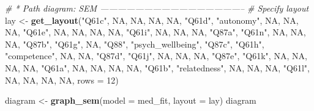 \documentclass[
]{article}
\newenvironment{Shaded}{\begin{snugshade}}{\end{snugshade}}
\newcommand{\CommentTok}[1]{\textcolor[rgb]{0.56,0.35,0.01}{\textit{#1}}}
\newcommand{\DataTypeTok}[1]{\textcolor[rgb]{0.13,0.29,0.53}{#1}}
\newcommand{\DecValTok}[1]{\textcolor[rgb]{0.00,0.00,0.81}{#1}}
\newcommand{\KeywordTok}[1]{\textcolor[rgb]{0.13,0.29,0.53}{\textbf{#1}}}
\newcommand{\NormalTok}[1]{#1}
\newcommand{\OtherTok}[1]{\textcolor[rgb]{0.56,0.35,0.01}{#1}}
\newcommand{\StringTok}[1]{\textcolor[rgb]{0.31,0.60,0.02}{#1}}
\begin{document}
\begin{Shaded}
\begin{Highlighting}[]
\CommentTok{# * Path diagram: SEM --------------------------------------------------}
\CommentTok{# Specify layout}
\NormalTok{lay <-}\StringTok{ }\KeywordTok{get_layout}\NormalTok{(}\StringTok{"Q61c"}\NormalTok{, }\OtherTok{NA}\NormalTok{, }\OtherTok{NA}\NormalTok{, }\OtherTok{NA}\NormalTok{, }\OtherTok{NA}\NormalTok{,}
                  \StringTok{"Q61d"}\NormalTok{, }\StringTok{"autonomy"}\NormalTok{, }\OtherTok{NA}\NormalTok{, }\OtherTok{NA}\NormalTok{, }\OtherTok{NA}\NormalTok{,}
                  \StringTok{"Q61e"}\NormalTok{, }\OtherTok{NA}\NormalTok{, }\OtherTok{NA}\NormalTok{, }\OtherTok{NA}\NormalTok{, }\OtherTok{NA}\NormalTok{,}
                  \StringTok{"Q61i"}\NormalTok{, }\OtherTok{NA}\NormalTok{, }\OtherTok{NA}\NormalTok{, }\OtherTok{NA}\NormalTok{, }\StringTok{"Q87a"}\NormalTok{,}
                  \StringTok{"Q61n"}\NormalTok{, }\OtherTok{NA}\NormalTok{, }\OtherTok{NA}\NormalTok{, }\OtherTok{NA}\NormalTok{, }\StringTok{"Q87b"}\NormalTok{,}
                  \StringTok{"Q61g"}\NormalTok{, }\OtherTok{NA}\NormalTok{, }\StringTok{"Q88"}\NormalTok{, }\StringTok{"psych_wellbeing"}\NormalTok{, }\StringTok{"Q87c"}\NormalTok{,}
                  \StringTok{"Q61h"}\NormalTok{, }\StringTok{"competence"}\NormalTok{, }\OtherTok{NA}\NormalTok{, }\OtherTok{NA}\NormalTok{, }\StringTok{"Q87d"}\NormalTok{,}
                  \StringTok{"Q61j"}\NormalTok{, }\OtherTok{NA}\NormalTok{, }\OtherTok{NA}\NormalTok{, }\OtherTok{NA}\NormalTok{, }\StringTok{"Q87e"}\NormalTok{,}
                  \StringTok{"Q61k"}\NormalTok{, }\OtherTok{NA}\NormalTok{, }\OtherTok{NA}\NormalTok{, }\OtherTok{NA}\NormalTok{, }\OtherTok{NA}\NormalTok{,}
                  \StringTok{"Q61a"}\NormalTok{, }\OtherTok{NA}\NormalTok{, }\OtherTok{NA}\NormalTok{, }\OtherTok{NA}\NormalTok{, }\OtherTok{NA}\NormalTok{,}
                  \StringTok{"Q61b"}\NormalTok{, }\StringTok{"relatedness"}\NormalTok{, }\OtherTok{NA}\NormalTok{, }\OtherTok{NA}\NormalTok{, }\OtherTok{NA}\NormalTok{,}
                  \StringTok{"Q61l"}\NormalTok{, }\OtherTok{NA}\NormalTok{, }\OtherTok{NA}\NormalTok{, }\OtherTok{NA}\NormalTok{, }\OtherTok{NA}\NormalTok{,}
                  \DataTypeTok{rows =} \DecValTok{12}\NormalTok{)}

\NormalTok{diagram <-}\StringTok{ }\KeywordTok{graph_sem}\NormalTok{(}\DataTypeTok{model =}\NormalTok{ med_fit,}
                  \DataTypeTok{layout =}\NormalTok{ lay)}
\NormalTok{diagram}
\end{Highlighting}
\end{Shaded}
\end{document}
